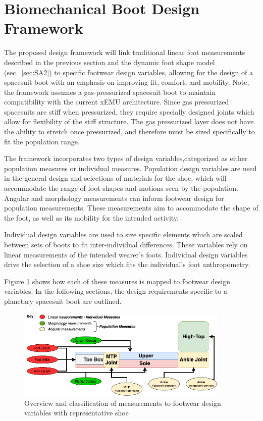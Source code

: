\documentclass[defaultstyle,11pt]{comps}
\begin{document}
\hypertarget{biomechanical-boot-design-framework}{%
\section{Biomechanical Boot Design Framework}\label{biomechanical-boot-design-framework}}

The proposed design framework will link traditional linear foot measurements described in the previous section and the dynamic foot shape model (sec.~\ref{sec:SA2}) to specific footwear design variables, allowing for the design of a spacesuit boot with an emphasis on improving fit, comfort, and mobility.
Note, the framework assumes a gas-pressurized spacesuit boot to maintain compatibility with the current xEMU architecture.
Since gas pressurized spacesuits are stiff when pressurized, they require specially designed joints which allow for flexibility of the stiff structure.
The gas pressurized layer does not have the ability to stretch once pressurized, and therefore must be sized specifically to fit the population range.

The framework incorporates two types of design variables,categorized as either population measures or individual measures.
Population design variables are used in the general design and selections of materials for the shoe, which will accommodate the range of foot shapes and motions seen by the population.
Angular and morphology measurements can inform footwear design for population measurements.
These measurements aim to accommodate the shape of the foot, as well as its mobility for the intended activity.

Individual design variables are used to size specific elements which are scaled between sets of boots to fit inter-individual differences.
These variables rely on linear measurements of the intended wearer's foots.
Individual design variables drive the selection of a shoe size which fits the individual's foot anthropometry.

Figure \ref{fig:SA3-Overview} shows how each of these measures is mapped to footwear design variables.
In the following sections, the design requirements specific to a planetary spacesuit boot are outlined.

\begin{figure}
\hypertarget{fig:SA3-Overview}{%
\centering
\includegraphics[width=0.9\textwidth,height=\textheight]{../fig/SA3/Overview.png}
\caption{Overview and classification of measurements to footwear design variables with representative shoe}\label{fig:SA3-Overview}
}
\end{figure}
\end{document}
